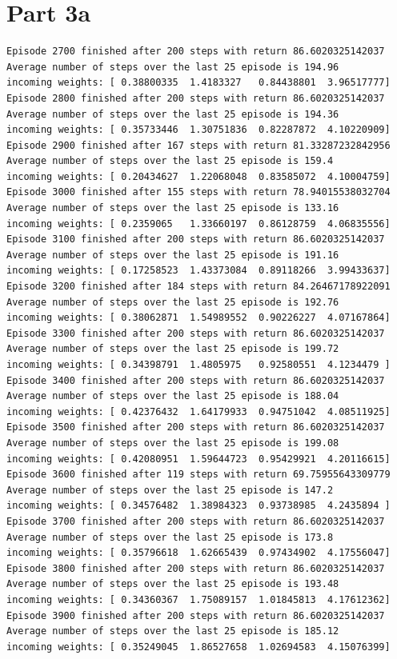 \documentclass{article}
\newcommand{\enterProblemHeader}[1]{
}
\newcommand{\exitProblemHeader}[1]{
}
\newcounter{homeworkProblemCounter} %
\newcommand{\homeworkProblemName}{}
\newenvironment{homeworkProblem}[1][Part \arabic{homeworkProblemCounter}]{ %
\stepcounter{homeworkProblemCounter} %
\renewcommand{\homeworkProblemName}{#1} %
\section{\homeworkProblemName} %
\enterProblemHeader{\homeworkProblemName} %
}{
\exitProblemHeader{\homeworkProblemName} %
}
\begin{document}
\begin{homeworkProblem}[Part 3a]
\begin{verbatim}
Episode 2700 finished after 200 steps with return 86.6020325142037
Average number of steps over the last 25 episode is 194.96
incoming weights: [ 0.38800335  1.4183327   0.84438801  3.96517777]
Episode 2800 finished after 200 steps with return 86.6020325142037
Average number of steps over the last 25 episode is 194.36
incoming weights: [ 0.35733446  1.30751836  0.82287872  4.10220909]
Episode 2900 finished after 167 steps with return 81.33287232842956
Average number of steps over the last 25 episode is 159.4
incoming weights: [ 0.20434627  1.22068048  0.83585072  4.10004759]
Episode 3000 finished after 155 steps with return 78.94015538032704
Average number of steps over the last 25 episode is 133.16
incoming weights: [ 0.2359065   1.33660197  0.86128759  4.06835556]
Episode 3100 finished after 200 steps with return 86.6020325142037
Average number of steps over the last 25 episode is 191.16
incoming weights: [ 0.17258523  1.43373084  0.89118266  3.99433637]
Episode 3200 finished after 184 steps with return 84.26467178922091
Average number of steps over the last 25 episode is 192.76
incoming weights: [ 0.38062871  1.54989552  0.90226227  4.07167864]
Episode 3300 finished after 200 steps with return 86.6020325142037
Average number of steps over the last 25 episode is 199.72
incoming weights: [ 0.34398791  1.4805975   0.92580551  4.1234479 ]
Episode 3400 finished after 200 steps with return 86.6020325142037
Average number of steps over the last 25 episode is 188.04
incoming weights: [ 0.42376432  1.64179933  0.94751042  4.08511925]
Episode 3500 finished after 200 steps with return 86.6020325142037
Average number of steps over the last 25 episode is 199.08
incoming weights: [ 0.42080951  1.59644723  0.95429921  4.20116615]
Episode 3600 finished after 119 steps with return 69.75955643309779
Average number of steps over the last 25 episode is 147.2
incoming weights: [ 0.34576482  1.38984323  0.93738985  4.2435894 ]
Episode 3700 finished after 200 steps with return 86.6020325142037
Average number of steps over the last 25 episode is 173.8
incoming weights: [ 0.35796618  1.62665439  0.97434902  4.17556047]
Episode 3800 finished after 200 steps with return 86.6020325142037
Average number of steps over the last 25 episode is 193.48
incoming weights: [ 0.34360367  1.75089157  1.01845813  4.17612362]
Episode 3900 finished after 200 steps with return 86.6020325142037
Average number of steps over the last 25 episode is 185.12
incoming weights: [ 0.35249045  1.86527658  1.02694583  4.15076399]
\end{verbatim}
\end{homeworkProblem}
\clearpage
\end{document}
